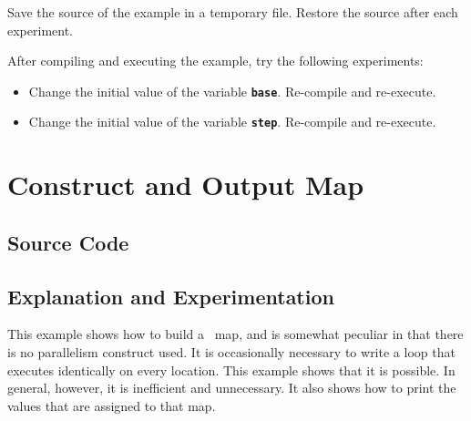 \documentclass{report}
\begin{document}
Save the source of the example in a temporary file.
Restore the source after each experiment.

After compiling and executing the example, try the following experiments:
\begin{itemize}
\item
Change the initial value of the variable
\texttt{{\bf base}}.
Re-compile and re-execute.
\item
Change the initial value of the variable
\texttt{{\bf step}}.
Re-compile and re-execute.
\end{itemize}


\pagebreak
\section{Construct and Output Map}

\subsection{Source Code}



\subsection{Explanation and Experimentation}

This example shows how to build a \stapl\ map, 
and is somewhat peculiar in that there is no parallelism construct
used.  It is occasionally necessary to write a loop that executes identically
on every location.  This example shows that it is possible.  In general,
however, it is inefficient and unnecessary.
It also shows how to print the values that are assigned to that map.
\end{document}
